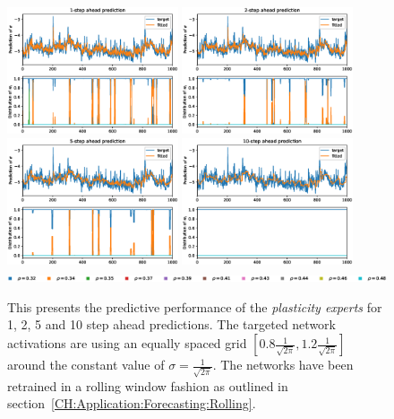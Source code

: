 \begin{figure}
    \begin{center}
        \includegraphics[width=0.45\textwidth]{Plots/Prediction/Plasticity_Grid_rolling_1step.eps}
        \includegraphics[width=0.45\textwidth]{Plots/Prediction/Plasticity_Grid_rolling_2step.eps} \\
        \includegraphics[width=0.45\textwidth]{Plots/Prediction/Plasticity_Grid_rolling_5step.eps}
        \includegraphics[width=0.45\textwidth]{Plots/Prediction/Plasticity_Grid_rolling_10step.eps} \\
        \includegraphics[width=1.0\textwidth]{Plots/Prediction/legend_Grid.eps}
    \end{center}
    \caption{This presents the predictive performance of the \textit{plasticity experts} for 1, 2, 5 and 10 step ahead predictions. The targeted network activations are using an equally spaced grid $\left[0.8\frac{1}{\sqrt{2\pi}}, 1.2\frac{1}{\sqrt{2\pi}}\right]$ around the constant value of $\sigma = \frac{1}{\sqrt{2\pi}}$. The networks have been retrained in a rolling window fashion as outlined in section \ref{CH:Application:Forecasting:Rolling}.}
    \label{FIG:PlasticityGridRolling}
\end{figure}

